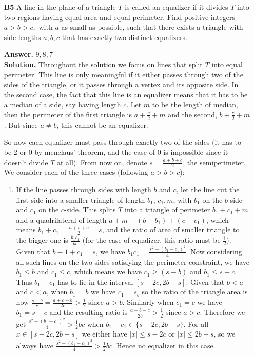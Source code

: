 \documentclass[11pt,a4paper]{article}
\newcommand{\<}{\langle}
\renewcommand{\>}{\rangle}
\begin{document}
\begin{enumerate}
\item[\textbf{B5}]A line in the plane of a triangle $T$ is called an equalizer if it divides $T$ into two regions having equal area and equal perimeter. Find positive integers $a>b>c,$ with $a$ as small as possible, such that there exists a triangle with side lengths $a,b,c$ that has exactly two distinct equalizers.

\textbf{Answer.} $9, 8, 7$ \\
\textbf{Solution.} Throughout the solution we focus on lines that split $T$ into equal perimeter. This line is only meaningful if it either passes through two of the sides of the triangle, or it passes through a vertex and its opposite side. In the second case, the fact that this line is an equalizer means that it has to be a median of a side, say having length $c$. Let $m$ to be the length of median, then the perimeter of the first triangle is $a+\frac c2+m$ and the second, $b+\frac c2 + m$. But since $a\neq b$, this cannot be an equalizer. 

So now each equalizer must pass through exactly two of the sides (it has to be 2 or 0 by menelaus' theorem, and the case of 0 is impossible since it doesn't divide $T$ at all). 
From now on, denote $s=\frac{a+b+c}{2}$, the semiperimeter. 
We consider each of the three cases (following $a>b>c$):
\begin{enumerate}
	\item If the line passes through sides with length $b$ and $c$, let the line cut the first side into a smaller triangle of length $b_1$, $c_1, m$, with $b_1$ on the $b$-side and $c_1$ on the $c$-side. This splits $T$ into a triangle of perimeter $b_1+c_1+m$ and a quadrilateral of length $a+m+(b-b_1)+(c-c_1)$, which means $b_1+c_1=\frac{a+b+c}{2}=s$, and the ratio of area of smaller triangle to the bigger one is $\frac{b_1c_1}{bc}$ (for the case of equalizer, this ratio must be $\frac 12$). Given that $b-1+c_1=s$, we have $b_1c_1=\frac{s^2-(b_1-c_1)^2}{4}$. Now considering all such lines on the two sides satisfying the perimeter constraint, we have $b_1\le b$ and $c_1\le c$, which means we have $c_1\ge (s-b)$ and $b_1\le s-c$. Thus $b_1-c_1$ has to lie in the interval $[s-2c, 2b-s]$. Given that $b<a$ and $c<a$, when $b_1=b$ we have $c_1=s_b$ so the ratio of the triangle area is now $\frac{s-b}{c}=\frac{a+c-b}{2c}>\frac 12$ since $a>b$. Similarly when $c_1=c$ we have $b_1=s-c$ and the resulting ratio is $\frac{a+b-c}{2b}>\frac 12$ since $a>c$. Therefore we get $\frac{s^2-(b_1-c_1)^2}{4}>\frac 12 bc$ when $b_1-c_1\in\{s-2c, 2b-s\}$. For all $x\in [s-2c, 2b-s]$ we either have $|x|\le s-2c$ or $|x|\le 2b-s$, so we always have $\frac{s^2-(b_1-c_1)^2}{4}>\frac 12 bc$. Hence no equalizer in this case. 
	

\end{enumerate}
\end{enumerate}
\end{document}
